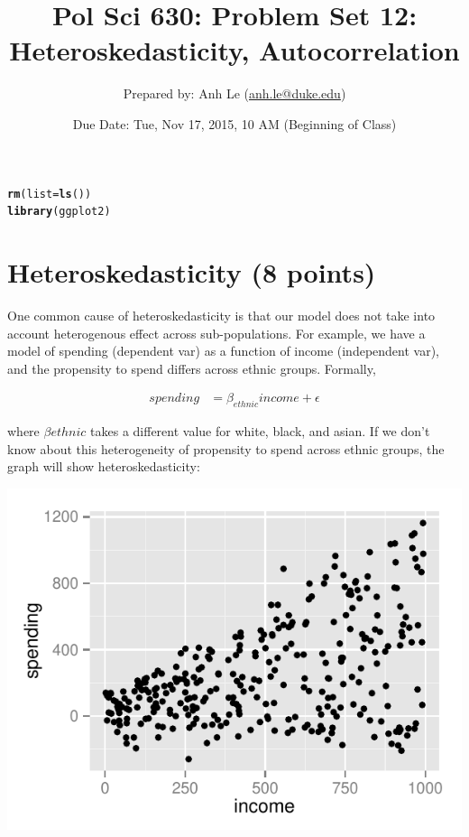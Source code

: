 \documentclass{article}\usepackage[]{graphicx}\usepackage[]{color}
\makeatletter
\def\maxwidth{ %
  \ifdim\Gin@nat@width>\linewidth
    \linewidth
  \else
    \Gin@nat@width
  \fi
}
\newcommand{\hlstd}[1]{\textcolor[rgb]{0.345,0.345,0.345}{#1}}%
\newcommand{\hlkwc}[1]{\textcolor[rgb]{0.333,0.667,0.333}{#1}}%
\newcommand{\hlkwd}[1]{\textcolor[rgb]{0.737,0.353,0.396}{\textbf{#1}}}%
\newenvironment{kframe}{%
 \def\at@end@of@kframe{}%
 \ifinner\ifhmode%
  \def\at@end@of@kframe{\end{minipage}}%
  \begin{minipage}{\columnwidth}%
 \fi\fi%
 \def\FrameCommand##1{\hskip\@totalleftmargin \hskip-\fboxsep
 \colorbox{shadecolor}{##1}\hskip-\fboxsep
     \hskip-\linewidth \hskip-\@totalleftmargin \hskip\columnwidth}%
 \MakeFramed {\advance\hsize-\width
   \@totalleftmargin\z@ \linewidth\hsize
   \@setminipage}}%
 {\par\unskip\endMakeFramed%
 \at@end@of@kframe}
\newenvironment{knitrout}{}{} %
\makeatother
\begin{document}
\title{Pol Sci 630:  Problem Set 12: Heteroskedasticity, Autocorrelation}

\author{Prepared by: Anh Le (\href{mailto:anh.le@duke.edu}{anh.le@duke.edu})}

\date{Due Date: Tue, Nov 17, 2015, 10 AM (Beginning of Class)}

\maketitle

\begin{knitrout}
\color{fgcolor}\begin{kframe}
\begin{alltt}
\hlkwd{rm}\hlstd{(}\hlkwc{list} \hlstd{=} \hlkwd{ls}\hlstd{())}
\hlkwd{library}\hlstd{(ggplot2)}
\end{alltt}
\end{kframe}
\end{knitrout}


\section{Heteroskedasticity (8 points)}

One common cause of heteroskedasticity is that our model does not take into account heterogenous effect across sub-populations. For example, we have a model of spending (dependent var) as a function of income (independent var), and the propensity to spend differs across ethnic groups. Formally,

\begin{align}
spending &= \beta_{ethnic} income + \epsilon
\end{align}

where $\beta{ethnic}$ takes a different value for white, black, and asian. If we don't know about this heterogeneity of propensity to spend across ethnic groups, the graph will show heteroskedasticity:

\begin{knitrout}
\color{fgcolor}
\includegraphics[width=\maxwidth]{figure/unnamed-chunk-2-1} 

\end{knitrout}
\end{document}

